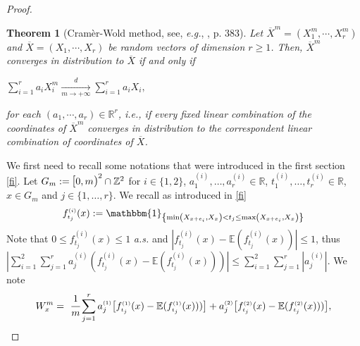 \documentclass[12pt]{article}
\theoremstyle{Theorem}
\newtheorem{Theorem}{Theorem}[section]
\begin{document}
{\begin{proof}
\begin{Theorem}[Cram\`{e}r-Wold method, see, \textit{e.g.},  \cite{Billingsley}, p. 383]
Let $\overline {X}^{\scriptscriptstyle m} = (X^{m}_{\scriptscriptstyle 1}, \cdots, X^{m}_{\scriptscriptstyle r})$ and $\overline {X} = (X_{\scriptscriptstyle 1}, \cdots, X_{\scriptscriptstyle r})$ be random vectors of dimension $r \geq 1$. Then, $\overline {X}^{\scriptscriptstyle m}$ converges in distribution to $\overline {X}$ if and only if
\begin{center}
$\sum_{i = 1}^{r} a_{i}X_{i}^{m} \xrightarrow[m \to + \infty]{d} \sum_{i = 1}^{r} a_iX_i,$\end{center}
for each $(a_1, \cdots, a_r) \in \mathbb{R}^{r}$, \textit{i.e.}, if every fixed linear combination of the coordinates of $\overline{X}^{m}$ converges in distribution to the correspondent linear combination of coordinates of $\overline {X}$.
\end{Theorem}
We first need to recall some notations that were introduced in the first section \eqref{fi}. Let $G_{m} := \text{\larger[1]{$[$}}0, m \text{\larger[1]{$)$}}^{2} \cap \mathbb{Z}^{2}$  for $i \in \{1,2\}$,  $a^{\scriptscriptstyle (i)}_{1}, \ldots, a^{\scriptscriptstyle (i)}_{r} \in \mathbb{R}$, $t^{\scriptscriptstyle (i)}_{1}, \ldots, t^{\scriptscriptstyle (i)}_{r} \in \mathbb{R}$, $x \in G_{m}$ and $j \in \{1,\ldots,r\}$.  We recall as introduced in \eqref{fi}
\begin{align*}
f_{\scriptscriptstyle t_j}^{\scriptscriptstyle (i)}(x) := \mathbbm{1}_{\left\{\min\left(X_{x+e_{i}}, X_{\scriptscriptstyle x}\right) < t_j \leq \max\left(X_{x+e_{i}}, X_{\scriptscriptstyle x}\right)\right\}}
\end{align*}
Note that $0 \leq f_{\scriptscriptstyle t_j}^{\scriptscriptstyle (i)}(x) \leq 1$ \textit{a.s.} and $|f_{\scriptscriptstyle t_j}^{\scriptscriptstyle (i)}(x) - \mathbb{E}(f_{\scriptscriptstyle t_j}^{\scriptscriptstyle (i)}(x))| \leq 1$, \linebreak thus $|\sum^{2}_{i = 1}\sum_{j=1}^{r} a^{\scriptscriptstyle (i)}_j(f_{\scriptscriptstyle t_j}^{\scriptscriptstyle (i)}(x) - \mathbb{E}(f_{\scriptscriptstyle t_j}^{\scriptscriptstyle (i)}(x)))| \leq \sum_{i = 1}^{2}\sum_{j =1}^{r} |a^{\scriptscriptstyle (i)}_j|$.
We note
\begin{equation}
\label{X}
W_{x}^{m} =~\cfrac{1}{m}\sum_{j = 1}^{r}a^{\scriptscriptstyle (1)}_j\big[f_{\scriptscriptstyle t_j}^{\scriptscriptstyle (1)}(x) - \mathbb{E}(f_{\scriptscriptstyle t_j}^{\scriptscriptstyle (1)}(x))) \big] + a^{\scriptscriptstyle (2)}_j\big[f_{\scriptscriptstyle t_j}^{\scriptscriptstyle (2)}(x) - \mathbb{E}(f_{\scriptscriptstyle t_j}^{\scriptscriptstyle (2)}(x))) \big] ,

\end{equation}
\end{proof}}
\end{document}
